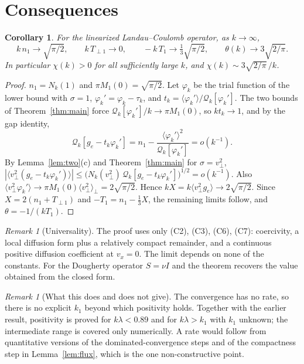\documentclass[11pt]{article}
\newcommand{\cQ}{\mathcal{Q}}
\newcommand{\avg}[1]{\langle #1\rangle}
\newtheorem{corollary}[theorem]{Corollary}
\theoremstyle{remark}
\newtheorem{remark}[theorem]{Remark}
\begin{document}
\section{Consequences}

\begin{corollary}\label{cor:theta}
For the linearized Landau--Coulomb operator, as $k\to\infty$,
\[
  k\,n_1\to\sqrt{\pi/2},\qquad
  k\,T_{\perp1}\to0,\qquad
  -k\,T_1\to\tfrac13\sqrt{\pi/2},\qquad
  \theta(k)\to3\sqrt{2/\pi}.
\]
In particular $\chi(k)>0$ for all sufficiently large $k$, and
$\chi(k)\sim3\sqrt{2/\pi}\,/k$.
\end{corollary}

\begin{proof}
$n_1=N_k(1)$ and $\pi M_1(0)=\sqrt{\pi/2}$. Let $\varphi_k$ be the trial
function of the lower bound with $\sigma=1$,
$\varphi_k'=\varphi_k-\tau_k$, and $t_k=\avg{\varphi_k'}/\cQ_k[\varphi_k']$.
The two bounds of Theorem~\ref{thm:main} force
$\cQ_k[\varphi_k']/k\to\pi M_1(0)$, so $kt_k\to1$, and by the gap identity,
\[
  \cQ_k[g_e-t_k\varphi_k']
  =n_1-\frac{\avg{\varphi_k'}^2}{\cQ_k[\varphi_k']}=o(k^{-1}).
\]
By Lemma~\ref{lem:two}(c) and Theorem~\ref{thm:main} for
$\sigma=v_\perp^2$,
$|\avg{v_\perp^2(g_e-t_k\varphi_k')}|\le
\bigl(N_k(v_\perp^2)\,\cQ_k[g_e-t_k\varphi_k']\bigr)^{1/2}=o(k^{-1})$.
Also $\avg{v_\perp^2\varphi_k'}\to\pi M_1(0)\avg{v_\perp^2}_\perp
=2\sqrt{\pi/2}$. Hence $kX=k\avg{v_\perp^2g_e}\to2\sqrt{\pi/2}$. Since
$X=2(n_1+T_{\perp1})$ and $-T_1=n_1-\tfrac13X$, the remaining limits follow,
and $\theta=-1/(kT_1)$.
\end{proof}

\begin{remark}[Universality]
The proof uses only (C2), (C3), (C6), (C7): coercivity, a local diffusion
form plus a relatively compact remainder, and a continuous positive
diffusion coefficient at $v_x=0$. The limit depends on none of the
constants. For the Dougherty operator $S=\nu I$ and the theorem recovers the
value obtained from the closed form.
\end{remark}

\begin{remark}[What this does and does not give]
The convergence has no rate, so there is no explicit $k_1$ beyond which
positivity holds. Together with the earlier result, positivity is proved for
$k\lambda<0.89$ and for $k\lambda>k_1$ with $k_1$ unknown; the intermediate
range is covered only numerically. A rate would follow from quantitative
versions of the dominated-convergence steps and of the compactness step in
Lemma~\ref{lem:flux}, which is the one non-constructive point.
\end{remark}
\end{document}
